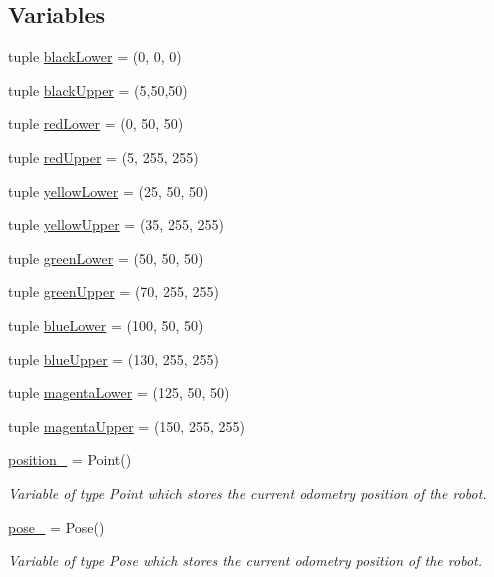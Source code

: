 \subsection*{Variables}
\begin{DoxyCompactItemize}
\item 
tuple \hyperlink{namespacetrackObj_a184ba66fcdfcd61ebae9b1d3e2b63619}{black\+Lower} = (0, 0, 0)
\item 
tuple \hyperlink{namespacetrackObj_a80437a897fbffe98b19b9f34b41f6fb9}{black\+Upper} = (5,50,50)
\item 
tuple \hyperlink{namespacetrackObj_a254eae258b8c741920e95c1b9deb5b21}{red\+Lower} = (0, 50, 50)
\item 
tuple \hyperlink{namespacetrackObj_a26c8bcf20da4ec8e86539340b717cff0}{red\+Upper} = (5, 255, 255)
\item 
tuple \hyperlink{namespacetrackObj_ad2c51d697e73d157dc369cdfcbcb1ee7}{yellow\+Lower} = (25, 50, 50)
\item 
tuple \hyperlink{namespacetrackObj_af68b499763ff9ad8cf67d7358916fb93}{yellow\+Upper} = (35, 255, 255)
\item 
tuple \hyperlink{namespacetrackObj_a0cc0f702e80caa290104f8ec9ec0c982}{green\+Lower} = (50, 50, 50)
\item 
tuple \hyperlink{namespacetrackObj_a850397b5864f84ebbf6710a6f2c36ad0}{green\+Upper} = (70, 255, 255)
\item 
tuple \hyperlink{namespacetrackObj_a49c0d90afa1ef612edf2cb5dc3c074b1}{blue\+Lower} = (100, 50, 50)
\item 
tuple \hyperlink{namespacetrackObj_a58dc488cc8c68f1f01d62ba19e87a45e}{blue\+Upper} = (130, 255, 255)
\item 
tuple \hyperlink{namespacetrackObj_af3b410969d89c97e9d04a36fcc9df142}{magenta\+Lower} = (125, 50, 50)
\item 
tuple \hyperlink{namespacetrackObj_a4ae931a000b87b27fc192cc9c6e59d4c}{magenta\+Upper} = (150, 255, 255)
\item 
\hyperlink{namespacetrackObj_a2528d68e56afa8757353f10b9bb0de98}{position\+\_\+} = Point()
\begin{DoxyCompactList}\small\item\em Variable of type Point which stores the current odometry position of the robot. \end{DoxyCompactList}\item 
\hyperlink{namespacetrackObj_a6e0e2386b03c1220047a354e6d19fb6c}{pose\+\_\+} = Pose()
\begin{DoxyCompactList}\small\item\em Variable of type Pose which stores the current odometry position of the robot. \end{DoxyCompactList}\end{DoxyCompactItemize}


